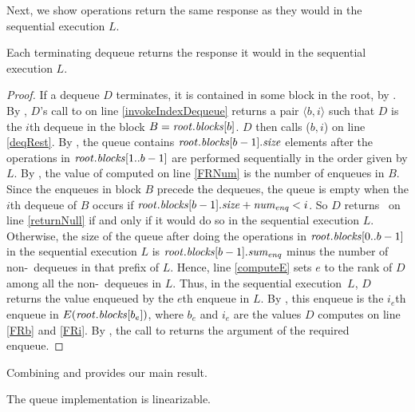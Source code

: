Next, we show operations return the same response as they would in the sequential execution $L$.

\begin{lemma}\label{linearCorrect}
Each terminating dequeue returns the response it would in the sequential execution $L$.
\end{lemma}
\begin{proof}
If a dequeue $D$ terminates, it is contained in some block in the root, by .
By , $D$'s call to  on line \ref{invokeIndexDequeue}
returns a pair $\langle b,i\rangle$ such that $D$ is the $i$th dequeue in the block 
$B=\mbox{\textnormal{\textit{root}}}.\mbox{\textit{blocks}}[b]$.
$D$ then calls ($b,i$) on line \ref{deqRest}.
By , the queue contains $\mbox{\textnormal{\textit{root}}}.\mbox{\textit{blocks}}[b-1].\mbox{\textit{size}}$ elements
after the operations in $\mbox{\textnormal{\textit{root}}}.\mbox{\textit{blocks}}[1..b-1]$ are performed sequentially 
in the order given by $L$.
By , the value of  computed on line \ref{FRNum}
is the number of enqueues in $B$.
Since the enqueues in block $B$ precede the dequeues,
the queue is empty when the $i$th dequeue of $B$ occurs if 
$\mbox{\textnormal{\textit{root}}}.\mbox{\textit{blocks}}[b-1].\mbox{\textit{size}} + \mbox{\textnormal{\textit{num\textsubscript{enq}}}} < i$.
So $D$ returns \nl\ on line \ref{returnNull} if and only if it would do so in the sequential
execution $L$.
Otherwise, the size of the queue after doing the operations in $\mbox{\textnormal{\textit{root}}}.\mbox{\textit{blocks}}[0..b-1]$
in the sequential execution $L$ is $\mbox{\textnormal{\textit{root}}}.\mbox{\textit{blocks}}[b-1].\mbox{\textit{sum\textsubscript{enq}}}$ minus
the number of non-\nl\ dequeues in that prefix of $L$.
Hence, line \ref{computeE} sets $e$ to the rank of $D$ among all the non-\nl\ dequeues in $L$.
Thus, in the sequential execution~$L$, $D$ returns the value enqueued by the $e$th enqueue in $L$.
By , this enqueue is the $i_e$th enqueue 
in $E(\mbox{\textnormal{\textit{root}}}.\mbox{\textit{blocks}}[b_e])$, where
$b_e$ and $i_e$ are the values $D$ computes on line \ref{FRb} and \ref{FRi}.
By , the call to  returns the argument of the required enqueue.
\end{proof}

Combining  and  provides our main result.

\begin{theorem}
The queue implementation is linearizable.
\end{theorem}


